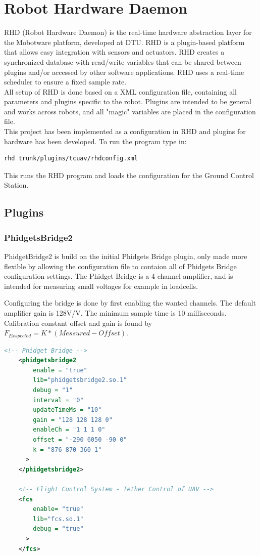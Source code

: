\chapter{Robot Hardware Daemon}
RHD (Robot Hardware Daemon) is the real-time hardware abstraction layer for the Mobotware platform, developed at DTU. RHD is a plugin-based platform that allows easy integration with sensors and actuators. RHD creates a synchronized database with read/write variables that can be shared between plugins and/or accessed by other software applications. RHD uses a real-time scheduler to ensure a fixed sample rate. \\
All setup of RHD is done based on a XML configuration file, containing all parameters and plugins specific to the robot. Plugins are intended to be general and works across robots, and all "magic" variables are placed in the configuration file.\\

\noindent
This project has been implemented as a configuration in RHD and plugins for hardware has been developed. To run the program type in:
\begin{lstlisting}[language=bash]
rhd trunk/plugins/tcuav/rhdconfig.xml
\end{lstlisting}
This runs the RHD program and loads the configuration for the Ground Control Station.


\section{Plugins}

\subsection{PhidgetsBridge2}
PhidgetBridge2 is build on the initial Phidgets Bridge plugin, only made more flexible by allowing the configuration file to contaion all of Phidgets Bridge configuration settings. The Phidget Bridge is a 4 channel amplifier, and is intended for measuring small voltages for example in loadcells. 

Configuring the bridge is done by first enabling the wanted channels. The default amplifier gain is 128V/V. The minimum sample time is 10 milliseconds. Calibration constant offset and gain is found by $F_{Exspected} = K*(Messured - Offset)$.

\begin{lstlisting}[language=XML]
<!-- Phidget Bridge -->
    <phidgetsbridge2
	    enable = "true"
	    lib="phidgetsbridge2.so.1"
	    debug = "1"
	    interval = "0"
	    updateTimeMs = "10"
	    gain = "128 128 128 0"
	    enableCh = "1 1 1 0"
	    offset = "-290 6050 -90 0"
	    k = "876 870 360 1"
      >
    </phidgetsbridge2>  
    
    <!-- Flight Control System - Tether Control of UAV -->
    <fcs 
	    enable= "true"
	    lib="fcs.so.1"
	    debug = "true"
      >
    </fcs>  
\end{lstlisting}

